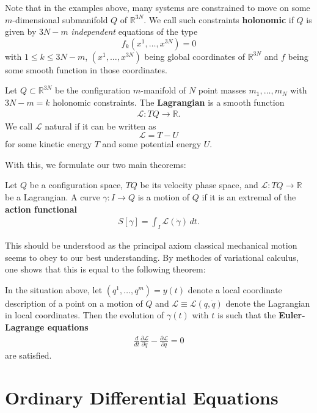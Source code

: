 Note that in the examples above, many systems are constrained to move on some $m$-dimensional submanifold $Q$ of $\mathbb{R}^{3N}$. We call such constraints \textbf{holonomic} if $Q$ is given by $3N-m$ \emph{independent} equations of the type
\[
    f_k(x^1, \dots, x^{3N})=0
\] with $1 \leq k \leq 3N-m$, $(x^1, \dots, x^{3N})$ being global coordinates of $\mathbb{R}^{3N}$ and $f$ being some smooth function in those coordinates. 
\begin{definition}[Lagrangian]
    Let $Q \subset \mathbb{R}^{3N}$ be the configuration $m$-manifold of $N$ point masses $m_1, \dots, m_N$ with $3N-m=k$ holonomic constraints. The \textbf{Lagrangian} is a smooth function
    \begin{align}
        \mathscr{L}: TQ \to \mathbb{R}.
    \end{align}
    We call $\mathscr{L}$ natural if it can be written as 
    \[
    \mathscr{L}=T-U
    \] for some kinetic energy $T$ and some potential energy $U$. 
\end{definition}
With this, we formulate our two main theorems:
\begin{theorem}
    Let $Q$ be a configuration space, $TQ$ be its velocity phase space, and $\mathscr{L}: TQ \to \mathbb{R}$ be a Lagrangian. A curve $\gamma: I \to Q$ is a motion of $Q$ if it is an extremal of the \textbf{action functional}
    \begin{align}
        S[\gamma]= \int_I \mathscr{L}(\dot{\gamma}) \, dt.
    \end{align}
\end{theorem}
This should be understood as the principal axiom classical mechanical motion seems to obey to our best understanding. By methodes of variational calculus, one shows that this is equal to the following theorem:
\begin{theorem}
    In the situation above, let $(q^1, \dots, q^m)=y(t)$ denote a local coordinate description of a point on a motion of $Q$ and $\mathscr{L}\equiv \mathscr{L}(q,\dot{q})$ denote the Lagrangian in local coordinates. Then the evolution of $\gamma(t)$ with $t$ is such that the \textbf{Euler-Lagrange equations}
    \begin{align}
        \frac{d}{dt}\frac{\partial \mathscr{L}}{\partial \dot{q}} - \frac{\partial \mathscr{L}}{\partial q}=0
    \end{align}
    are satisfied.
\end{theorem}
\section{Ordinary Differential Equations}
